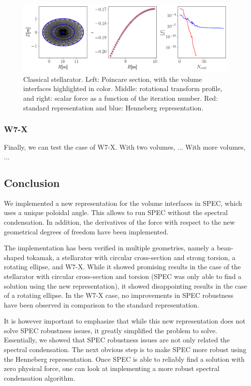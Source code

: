 \documentclass[my_thesis.tex]{subfiles}
\begin{document}
\begin{figure}
	\centering
	\includegraphics[width=\linewidth]{images/HennebergRepresentation/RotatingEllipse.png}
	\caption{Classical stellarator. Left: Poincare section, with the volume interfaces highlighted in color. Middle: rotational transform profile, and right: scalar force as a function of the iteration number. Red: standard representation and blue: Henneberg representation.}
	\label{fig classical stellarator henneberg representation}
\end{figure}


\subsubsection{W7-X}
Finally, we can test the case of W7-X. With two volumes, ... With more volumes, ...

\subsection{Conclusion}

We implemented a new representation for the volume interfaces in SPEC, which uses a unique poloidal angle. This allows to run SPEC without the spectral condensation. In addition, the derivatives of the force with respect to the new geometrical degrees of freedom have been implemented.

The implementation has been verified in multiple geometries, namely a bean-shaped tokamak, a stellarator with circular cross-section and strong torsion, a rotating ellipse, and W7-X. While it showed promising results in the case of the stellarator with circular cross-section and torsion (SPEC was only able to find a solution using the new representation), it showed disappointing results in the case of a rotating ellipse. In the W7-X case, no improvements in SPEC robustness have been observed in comparison to the standard representation.

It is however important to emphasize that while this new representation does not solve SPEC robustness issues, it greatly simplified the problem to solve. Essentially, we showed that SPEC robustness issues are not only related the spectral condensation. The next obvious step is to make SPEC more robust using the Henneberg representation. Once SPEC is able to reliably find a solution with zero physical force, one can look at implementing a more robust spectral condensation algorithm.
\end{document}
